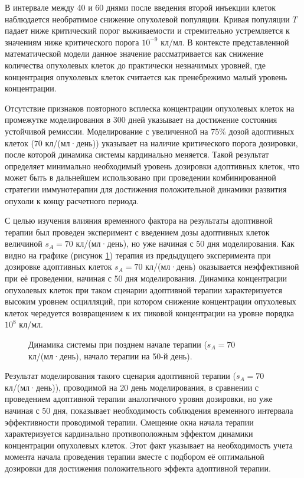 В интервале между 40 и 60 днями после введения второй инъекции клеток
наблюдается необратимое снижение опухолевой популяции. Кривая
популяции $T$ падает ниже критический порог выживаемости и стремительно
устремляется к значениям ниже критического порога $10^{-9}$ кл/мл. В контексте
представленной математической модели данное значение рассматривается как
снижение количества опухолевых клеток до практически незначимых уровней,
где концентрация опухолевых клеток считается как пренебрежимо малый уровень концентрации.

Отсутствие признаков повторного всплеска концентрации опухолевых клеток на
промежутке моделирования в 300 дней указывает на достижение состояния устойчивой ремиссии.
Моделирование с увеличенной на 75\% дозой адоптивных клеток ($70$ кл/(мл·день))
указывает на наличие критического порога дозировки, после которой динамика
системы кардинально меняется. Такой результат определяет минимально необходимый
уровень дозировки адоптивных клеток, что может быть в дальнейшем использовано
при проведении комбинированной стратегии иммунотерапии для достижения
положительной динамики развития опухоли к концу расчетного периода.

С целью изучения влияния временного фактора на результаты адоптивной терапии
был проведен эксперимент с введением дозы адоптивных клеток величиной $s_A =
70$ кл/(мл·день), но уже начиная с 50 дня моделирования. Как видно на графике
(рисунок \ref{fig:sa_timing_window}) терапия из предыдущего эксперимента при
дозировке адоптивных клеток $s_A = 70$ кл/(мл·день) оказывается неэффективной
при её проведении, начиная с 50 дня моделирования. Динамика концентрации
опухолевых клеток при таком сценарии адоптивной терапии характеризуется высоким
уровнем осцилляций, при котором снижение концентрации опухолевых клеток
чередуется возвращением к их пиковой концентрации на уровне порядка $10^8$ кл/мл.

\begin{figure}[ht!]
  \centering
  
  \caption{Динамика системы при позднем начале терапии ($s_A = 70$ кл/(мл·день),
  начало терапии на 50-й день).}
  \label{fig:sa_timing_window}
\end{figure}

Результат моделирования такого сценария адоптивной терапии ($s_A = 70$
кл/(мл·день)), проводимой на 20 день моделирования, в сравнении с проведением
адоптивной терапии аналогичного уровня дозировки, но уже начиная с 50 дня,
показывает необходимость соблюдения временного интервала эффективности проводимой терапии.
Смещение окна начала терапии характеризуется кардинально противоположным эффектом динамики
концентрации опухолевых клеток. Этот факт указывает на необходимость учета момента начала
проведения терапии вместе с подбором её оптимальной дозировки для достижения
положительного эффекта адоптивной терапии.

